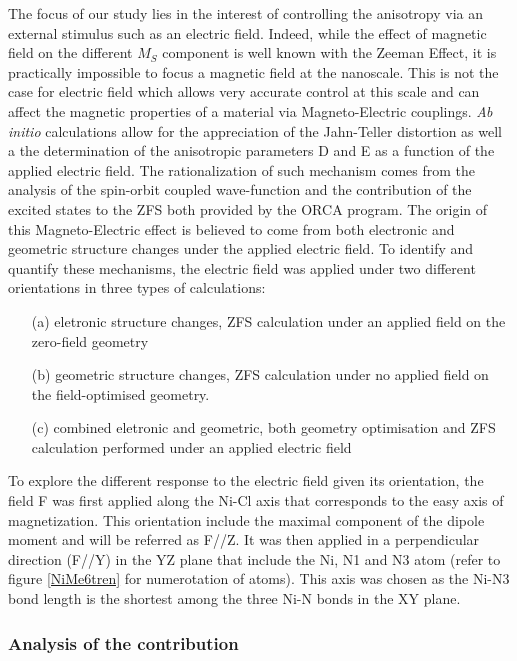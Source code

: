 \documentclass[10pt]{report}
\numberwithin{equation}{section}
\begin{document}
\par The focus of our study lies in the interest of controlling the anisotropy via an external stimulus such as an electric field.
Indeed, while the effect of magnetic field on the different $M_S$ component is well known with the Zeeman Effect, it is practically impossible to focus a magnetic field at the nanoscale.
This is not the case for electric field which allows very accurate control at this scale and can affect the magnetic properties of a material via Magneto-Electric couplings.
\textit{Ab} \textit{initio} calculations allow for the appreciation of the Jahn-Teller distortion as well a the determination of the anisotropic parameters D and E as a function of the applied electric field.
The rationalization of such mechanism comes from the analysis of the spin-orbit coupled wave-function and the contribution of the excited states to the ZFS both provided by the ORCA program.
The  origin of this Magneto-Electric effect is believed to come from both electronic and geometric structure changes under the applied electric field. 
To identify and quantify these mechanisms, the electric field was applied under two different orientations in three types of calculations:

\begin{itemize}
    \item[(a)] eletronic structure changes, ZFS calculation under an applied field on the zero-field geometry
    \item[(b)] geometric structure changes, ZFS calculation under no applied field on the field-optimised geometry.
    \item[(c)] combined eletronic and geometric, both geometry optimisation and ZFS calculation performed under an applied electric field
\end{itemize}

To explore the different response to the electric field given its orientation, the field F was first applied along the Ni-Cl axis that corresponds to the easy axis of magnetization.
This orientation include the maximal component of the dipole moment and will be referred as F//Z.
It was then applied in a perpendicular direction (F//Y) in the YZ plane that include the Ni, N1 and N3 atom (refer to figure \ref{NiMe6tren} for numerotation of atoms). 
This axis was chosen as the Ni-N3 bond length is the shortest among the three Ni-N bonds in the XY plane.

\subsubsection*{Analysis of the contribution}
\end{document}

